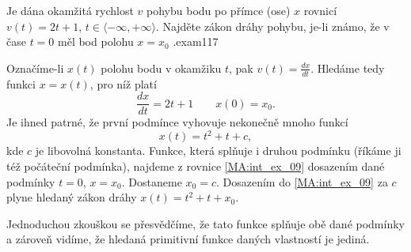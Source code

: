 \begin{mathexam}{Je dána okamžitá rychlost \(v\) pohybu bodu po přímce (ose) \(x\) rovnicí \(v(t) =
  2t + 1\), \(t\in\langle -\infty,+\infty \rangle\). Najděte zákon dráhy pohybu, je-li známo, že v
  čase \(t = 0\) měl bod polohu \(x = x_0\) \cite[p.~253]{Brabec1989}.}{exam117}

  Označíme-li \(x(t)\) polohu bodu v okamžiku \(t\), pak \(v(t) = \frac{dx}{dt}\). Hledáme tedy
  funkci \(x = x(t)\), pro níž platí \[\frac{dx}{dt} = 2t + 1 \qquad x(0) = x_0.\] Je ihned patrné,
  že první podmínce vyhovuje nekonečně mnoho funkcí
  \begin{equation}\label{MA:int_ex_09}
    x(t) = t^2 + t + c, 
  \end{equation}
  kde \(c\) je libovolná konstanta. Funkce, která splňuje i druhou podmínku (říkáme ji též počáteční
  podmínka), najdeme z rovnice \ref{MA:int_ex_09} dosazením dané podmínky \(t = 0\), \(x = x_0\).
  Dostaneme \(x_0 = c\). Dosazením do \ref{MA:int_ex_09} za \(c\) plyne hledaný zákon dráhy \(x(t) =
  t^2+t+x_0\).                 

  Jednoduchou zkouškou se přesvědčíme, že tato funkce splňuje obě dané podmínky a zároveň vidíme, že
  hledaná primitivní funkce daných vlastností je jediná.
\end{mathexam}